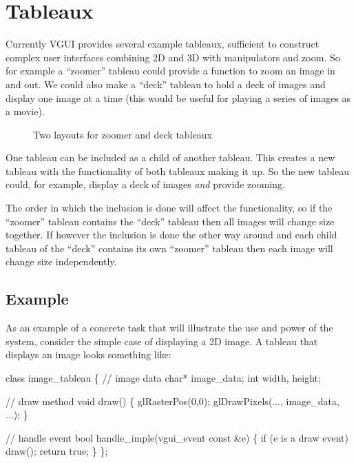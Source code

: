 \documentclass[12pt]{report} \usepackage{epsfig}
\begin{document}
\chapter{Tableaux}

Currently VGUI provides several example tableaux, sufficient to
construct complex user interfaces combining 2D and 3D with manipulators and zoom.
So for example a ``zoomer'' tableau could provide a function to zoom an image in and out.
We could also make a ``deck'' tableau to hold a deck of images and display one image at
a time (this would be useful for playing a series of images as a movie).

\begin{figure}[htb]
  \caption{Two layouts for zoomer and deck tableaux}
  \label{fig1}
\end{figure}

One tableau can be included as a child of another tableau.  This creates a new
tableau with the functionality of both tableaux making it up.
So the new tableau could, for example, display a deck of images {\it and} provide zooming.

The order in which the inclusion is done will affect the functionality, so if the
``zoomer'' tableau contains the ``deck'' tableau then all images will change
size together.  If however the inclusion is done the other way around and each
child tableau of the ``deck'' contains its own ``zoomer'' tableau
then each image will change size independently.

\section{Example}

As an example of a concrete task that will illustrate the use and power of
the system, consider the simple case of displaying a 2D image.  A tableau
that displays an image looks something like:

{\scriptsize \begin{verbawf}
  class image\_tableau
  \{
    // image data
    char* image\_data;
    int width, height;

    // draw method
    void draw()
    \{
      glRasterPos(0,0);
      glDrawPixels(..., image\_data, ...);
     \}

    // handle event
    bool handle_imple(vgui_event const &e)
    \{
      if (e is a draw event)
        draw();
      return true;
    \}
  \};
\end{verbawf}}
\end{document}
